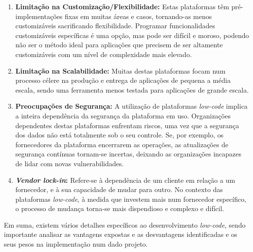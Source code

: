             \begin{enumerate}
                \item \textbf{Limitação na Customização/Flexibilidade:}  Estas plataformas têm pré-implementações fixas em muitas áreas e casos, tornando-as menos customizáveis sacrificando flexibilidade. Programar funcionalidades customizáveis específicas é uma opção, mas pode ser difícil e moroso, podendo não ser o método ideal para aplicações que precisem de ser altamente customizáveis com um nível de complexidade mais elevado.
            
                \item \textbf{Limitação na Scalabilidade:} Muitas destas plataformas focam num processo célere na produção e entrega de aplicações de pequena a média escala, sendo uma ferramenta menos testada para aplicações de grande escala.
            
                \item \textbf{Preocupações de Segurança:} A utilização de plataformas \textit{low-code} implica a inteira dependência da segurança da plataforma em uso. Organizações dependentes destas plataformas enfrentam riscos, uma vez que a segurança dos dados não está totalmente sob o seu controle. Se, por exemplo, os fornecedores da plataforma encerrarem as operações, as atualizações de segurança contínuas tornam-se incertas, deixando as organizações incapazes de lidar com novas vulnerabilidades.

                \item \textbf{\textit{Vendor lock-in}:} Refere-se à dependência de um cliente em relação a um fornecedor, e à sua capacidade de mudar para outro. No contexto das plataformas \textit{low-code}, à medida que investem mais num fornecedor específico, o processo de mudança torna-se mais dispendioso e complexo e difícil\cite{yan2021impacts}.
            \end{enumerate} 

            Em suma, existem vários detalhes específicos ao desenvolvimento \textit{low-code}, sendo importante analisar as vantagens expostas e as desvantagens identificadas e os seus pesos na implementação num dado projeto.


